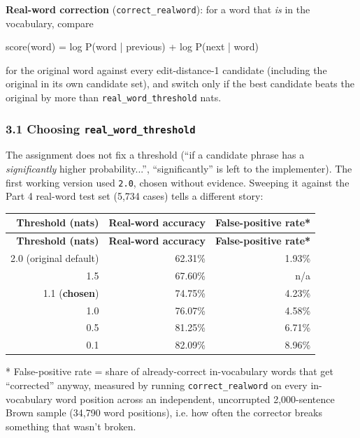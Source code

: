 \documentclass[11pt,a4paper]{article}
\begin{document}
\textbf{Real-word correction} (\texttt{correct\_\allowbreak{}realword}): for a word that \textit{is} in the vocabulary, compare

\begin{codeblock}
score(word) = log P(word | previous) + log P(next | word)
\end{codeblock}

for the original word against every edit-distance-1 candidate (including the original in its own candidate set), and switch only if the best candidate beats the original by more than \texttt{real\_\allowbreak{}word\_\allowbreak{}threshold} nats.

\subsubsection*{3.1 Choosing \texttt{real\_\allowbreak{}word\_\allowbreak{}threshold}}

The assignment does not fix a threshold (``if a candidate phrase has a \textit{significantly} higher probability...'', ``significantly'' is left to the implementer). The first working version used \texttt{2.\allowbreak{}0}, chosen without evidence. Sweeping it against the Part 4 real-word test set (5,734 cases) tells a different story:

{\small
\setlength{\tabcolsep}{4pt}
\begin{longtable}{rrr}
\toprule
\textbf{Threshold (nats)} & \textbf{Real-word accuracy} & \textbf{False-positive rate*} \\
\midrule
\endfirsthead
\toprule
\textbf{Threshold (nats)} & \textbf{Real-word accuracy} & \textbf{False-positive rate*} \\
\midrule
\endhead
2.0 (original default) & 62.31\% & 1.93\% \\
1.5 & 67.60\% & n/a \\
1.1 (\textbf{chosen}) & 74.75\% & 4.23\% \\
1.0 & 76.07\% & 4.58\% \\
0.5 & 81.25\% & 6.71\% \\
0.1 & 82.09\% & 8.96\% \\
\bottomrule
\end{longtable}}

* False-positive rate = share of already-correct in-vocabulary words that get ``corrected'' anyway, measured by running \texttt{correct\_\allowbreak{}realword} on every in-vocabulary word position across an independent, uncorrupted 2,000-sentence Brown sample (34,790 word positions), i.e. how often the corrector breaks something that wasn't broken.
\end{document}
